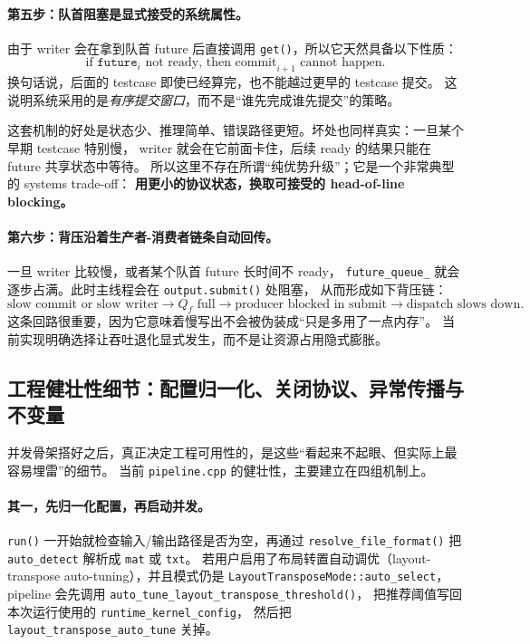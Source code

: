 \paragraph{第五步：队首阻塞是显式接受的系统属性。}
由于 writer 会在拿到队首 future 后直接调用 \texttt{get()}，所以它天然具备以下性质：
\[
    \text{if }\texttt{future}_i\text{ not ready, then commit}_{i+1}\text{ cannot happen.}
\]
换句话说，后面的 testcase 即使已经算完，也不能越过更早的 testcase 提交。
这说明系统采用的是\emph{有序提交窗口}，而不是“谁先完成谁先提交”的策略。

这套机制的好处是状态少、推理简单、错误路径更短。坏处也同样真实：一旦某个早期 testcase 特别慢，
writer 就会在它前面卡住，后续 ready 的结果只能在 future 共享状态中等待。
所以这里不存在所谓“纯优势升级”；它是一个非常典型的 systems trade-off：
\textbf{用更小的协议状态，换取可接受的 head-of-line blocking。}

\paragraph{第六步：背压沿着生产者-消费者链条自动回传。}
一旦 writer 比较慢，或者某个队首 future 长时间不 ready，
\texttt{future\_queue\_} 就会逐步占满。此时主线程会在 \texttt{output.submit()} 处阻塞，
从而形成如下背压链：
\[
    \text{slow commit or slow writer}
    \rightarrow
    Q_f \text{ full}
    \rightarrow
    \text{producer blocked in submit}
    \rightarrow
    \text{dispatch slows down}.
\]
这条回路很重要，因为它意味着慢写出不会被伪装成“只是多用了一点内存”。
当前实现明确选择让吞吐退化显式发生，而不是让资源占用隐式膨胀。

\subsection{工程健壮性细节：配置归一化、关闭协议、异常传播与不变量}

并发骨架搭好之后，真正决定工程可用性的，是这些“看起来不起眼、但实际上最容易埋雷”的细节。
当前 \texttt{pipeline.cpp} 的健壮性，主要建立在四组机制上。

\paragraph{其一，先归一化配置，再启动并发。}
\texttt{run()} 一开始就检查输入/输出路径是否为空，再通过
\texttt{resolve\_file\_format()} 把 \texttt{auto\_detect} 解析成 \texttt{mat} 或 \texttt{txt}。
若用户启用了布局转置自动调优（layout-transpose auto-tuning），并且模式仍是
\texttt{LayoutTransposeMode::auto\_select}，pipeline 会先调用
\texttt{auto\_tune\_layout\_transpose\_threshold()}，
把推荐阈值写回本次运行使用的 \texttt{runtime\_kernel\_config}，
然后把 \texttt{layout\_transpose\_auto\_tune} 关掉。

